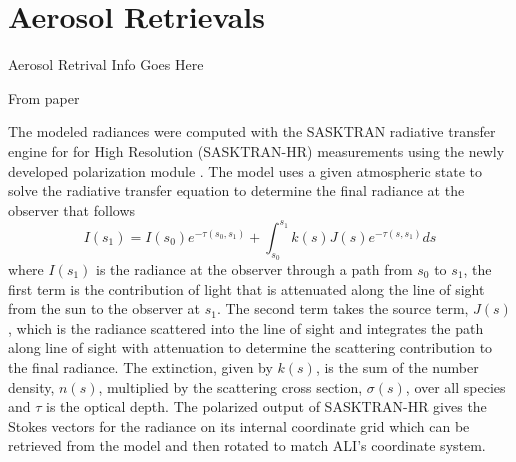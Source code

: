 \section{Aerosol Retrievals}

Aerosol Retrival Info Goes Here

From paper

The modeled radiances were computed with the SASKTRAN radiative transfer engine \citep{Bourassa2008a} for for High Resolution (SASKTRAN-HR) \citep{Zawada2015} measurements using the newly developed polarization module \citep{Dueck2015}. The model uses a given atmospheric state to solve the radiative transfer equation to determine the final radiance at the observer that follows
\begin{equation}
    I(s_{1}) = I(s_{0})e^{-\tau(s_{0}, s_{1})}+\int^{s_{1}}_{s_{0}}k(s)J(s)e^{-\tau(s, s_{1})}ds
\end{equation}
where $I(s_{1})$ is the radiance at the observer through a path from $s_{0}$ to $s_{1}$, the first term is the contribution of light that is attenuated along the line of sight from the sun to the observer at $s_{1}$. The second term takes the source term, $J(s)$, which is the radiance scattered into the line of sight and integrates the path along line of sight with attenuation to determine the scattering contribution to the final radiance. The extinction, given by $k(s)$, is the sum of the number density, $n(s)$, multiplied by the scattering cross section, $\sigma(s)$, over all species and $\tau$ is the optical depth. The polarized output of SASKTRAN-HR gives the Stokes vectors for the radiance on its internal coordinate grid which can be retrieved from the model and then rotated to match ALI's coordinate system.

